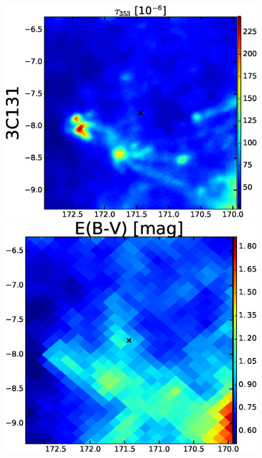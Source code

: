 \documentclass[preprint]{emulateapj}
\begin{document}
\begin{figure}
\centering     
\includegraphics[scale=0.23]{fig/src_eg_apd0_r0c0.eps}
\includegraphics[scale=0.21]{fig/src_eg_apd0_r0c1.eps}

\end{figure}
\end{document}

